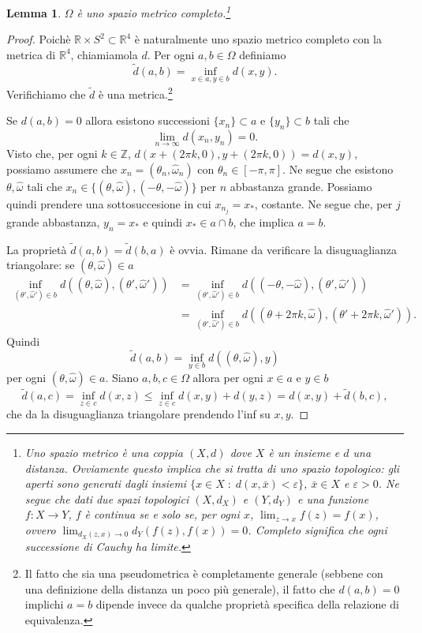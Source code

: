 \documentclass{amsart}
\numberwithin{equation}{section}
\newtheorem{lem}[thm]{Lemma}
\newcommand\bR{{\mathbb R}}
\newcommand\bZ{{\mathbb Z}}
\newcommand\ve{\varepsilon}
\newcommand{\homega}{\hat\omega}
\begin{document}
\begin{lem} $\Omega$ \`e uno spazio metrico completo.\footnote{ Uno spazio metrico \`e una coppia $(X,d)$ dove $X$ \`e un insieme e $d$ una distanza. Ovviamente questo implica che si tratta di uno spazio topologico: gli aperti sono generati dagli insiemi $\{x\in X\;:\; d(x,\bar x)<\ve\}$, $\bar x\in X$ e $\ve>0$. Ne segue che dati due spazi topologici $(X,d_X)$ e $(Y,d_Y)$ e una funzione $f:X\to Y$, $f$ \`e continua  se e solo se, per ogni $x$, $\lim_{z\to x} f(z)=f(x)$, ovvero $\lim_{d_X(z,x)\to 0} d_Y(f(z),f(x))=0$. Completo significa che ogni successione di Cauchy ha limite.} 
\end{lem}
\begin{proof}
Poich\`e $\bR\times S^2\subset \bR^4$ \`e naturalmente uno spazio metrico completo con la metrica di $\bR^4$, chiamiamola $d$. Per ogni $a,b\in\Omega$ definiamo
\[
\tilde d(a,b)=\inf_{x\in a, y\in b}d(x,y).
\]
Verifichiamo che $\tilde d$ \`e una metrica.\footnote{ Il fatto che sia una pseudometrica \`e completamente generale (sebbene con una definizione della distanza un poco pi\`u generale), il fatto che $d(a,b)=0$ implichi $a=b$ dipende invece da qualche propriet\`a specifica della relazione di equivalenza.} 

Se $d(a,b)=0$ allora esistono successioni $\{x_n\}\subset a$ e $\{y_n\}\subset b$ tali che 
\[
\lim_{n\to \infty}d(x_n,y_n)=0.
\]
Visto che, per ogni $k\in\bZ$, $d(x+(2\pi k,0), y+(2\pi k,0))=d(x,y)$, possiamo assumere che $x_n=(\theta_n,\homega_n)$ con $\theta_n\in [-\pi,\pi]$. Ne segue che esistono $\theta, \homega$ tali che $x_n\in\{(\theta,\homega),(-\theta,-\homega)\}$ per $n$ abbastanza grande. Possiamo quindi prendere una sottosuccesione in cui $x_{n_j}=x_*$, costante. Ne segue che, per $j$ grande abbastanza, $y_n= x_*$ e quindi $x_*\in a\cap b$, che implica $a=b$. 

La propriet\`a $\tilde d(a,b)=\tilde d(b,a)$ \`e ovvia. Rimane da verificare la disuguaglianza triangolare: se $(\theta,\homega)\in a$ 
\[
\begin{split}
\inf_{(\theta',\homega')\in b} d((\theta,\homega), (\theta',\homega'))&=\inf_{(\theta',\homega')\in b} d((-\theta,-\homega), (\theta',\homega'))\\
&=\inf_{(\theta',\homega')\in b}d((\theta+2\pi k,\homega), (\theta'+2\pi k,\homega')).
\end{split}
\]
Quindi
\[
\tilde d(a,b)=\inf_{y\in b}d((\theta,\homega), y)
\]
per ogni $(\theta,\homega)\in a$.
Siano $a,b,c\in \Omega$ allora per ogni  $x\in a$ e $y\in b$
\[
\tilde d(a,c)= \inf_{z\in c} d(x,z)\leq\inf_{z\in c}  d(x,y)+d(y,z) =d(x,y)+\tilde d(b,c),
\]
che da la disuguaglianza triangolare  prendendo l'inf su $x,y$.
\end{proof}
\end{document}
